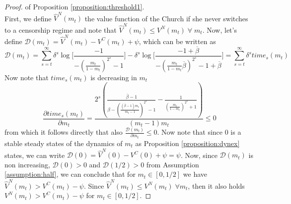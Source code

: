 \begin{proof} of Proposition \ref{proposition:threshold1}.\\
First, we define $\hat{V}^N(m_t)$ the value function of the Church if she never switches to a censorship regime and note that $\hat{V}^N(m_t)\leq V^N(m_t)\;\forall\;m_t$. Now, let's define $\mathcal{D}(m_t)=\hat{V}^N(m_t)-V^C(m_t)+\psi$, which can be written as
\[
\mathcal{D}(m_t)=\sum_{s=t}^{\infty}\delta^s\log\bigg[\frac{-1}{-(\frac{m_t}{1-m_t})^{2^s}-1}\bigg]-\delta^s\log\bigg[\frac{-1+\overline{\beta}}{-(\frac{m_t}{1-m_t}\overline{\beta})^{2^s}-1+\overline{\beta}}\bigg]=\sum_{s=t}^{\infty}\delta^s time_s(m_t)
\]
Now note that $time_s(m_t)$ is decreasing in $m_t$
\[
\frac{\partial time_s(m_t)}{\partial m_t}=\frac{2^s \left(\frac{\overline{\beta} -1}{\beta -\left(\frac{(\overline{\beta} -1) m_t}{m_t-1}\right)^{2^s}-1}-\frac{1}{\left(\frac{m_t}{1-m_t}\right)^{2^s}+1}\right)}{(m_t-1) m_t}\leq0
\]
from which it follows directly that also $\frac{\mathcal{D}(m_t)}{\partial m_t}\leq0$. Now note that since 0 is a stable steady states of the dynamics of $m_t$ as Proposition \ref{proposition:dynex} states, we can write $\mathcal{D}(0)=\hat{V}^N(0)-V^C(0)+\psi=\psi$. Now, since $\mathcal{D}(m_t)$ is non increasing, $\mathcal{D}(0)>0$ and $\mathcal{D}(1/2)>0$ from Assumption \ref{assumption:half}, we can conclude that for $m_t\in[0,1/2]$ we have $\hat{V}^N(m_t)>V^C(m_t)-\psi$. Since $\hat{V}^N(m_t)\leq V^N(m_t)\;\forall m_t$, then it also holds $V^N(m_t)>V^C(m_t)-\psi$ for $m_t\in[0,1/2]$.
\end{proof}

